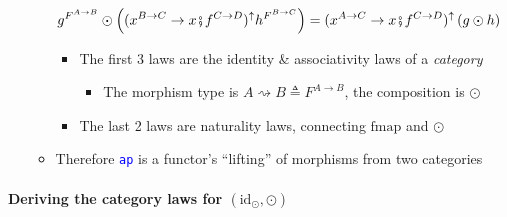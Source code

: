 \begin{itemize}
\begin{itemize}
{\begin{align*}
g^{F^{A\rightarrow B}}\odot\left((x^{B\rightarrow C}\rightarrow x\bef f^{C\rightarrow D})^{\uparrow}h^{F^{B\rightarrow C}}\right) & =(x^{A\rightarrow C}\rightarrow x\bef f^{C\rightarrow D})^{\uparrow}\left(g\odot h\right)
\end{align*}
}{\footnotesize\par}
\begin{itemize}
\item The first 3 laws are the identity \& associativity laws of a \emph{category}
\begin{itemize}
\item The morphism type is $A\rightsquigarrow B\triangleq F^{A\rightarrow B}$,
the composition is $\odot$
\end{itemize}
\item The last 2 laws are naturality laws, connecting $\text{fmap}$ and
$\odot$
\end{itemize}
\item Therefore \texttt{\textcolor{blue}{\footnotesize{}ap}} is a functor's
``lifting'' of morphisms from two categories
\end{itemize}
\end{itemize}


\paragraph{Deriving the category laws for $\left(\text{id}_{\odot},\odot\right)$}

